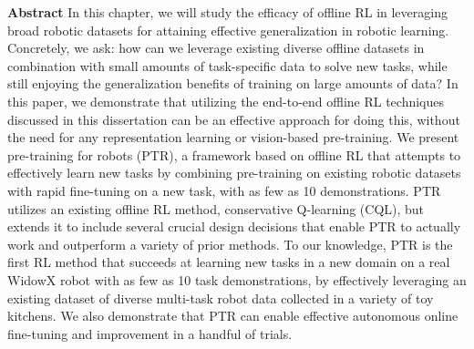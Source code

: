 \documentclass[../thesis.tex]{subfiles}
\begin{document}

\vspace{-0.4cm}
\begin{AIbox}{\large{\textbf{Abstract}}}
\vspace{4mm}
In this chapter, we will study the efficacy of offline RL in leveraging broad robotic datasets for attaining effective generalization in robotic learning.  Concretely, we ask: how can we leverage existing diverse offline datasets in combination with small amounts of task-specific data to solve new tasks, while still enjoying the generalization benefits of training on large amounts of data? In this paper, we demonstrate that utilizing the end-to-end offline RL techniques discussed in this dissertation can be an effective approach for doing this, without the need for any representation learning or vision-based pre-training. We present pre-training for robots (PTR), a framework based on offline RL that attempts to effectively learn new tasks by combining pre-training on existing robotic datasets with rapid fine-tuning on a new task, with as few as 10 demonstrations. PTR utilizes an existing offline RL method, conservative Q-learning (CQL), but extends it to include several crucial design decisions that enable PTR to actually work and outperform a variety of prior methods. To our knowledge, PTR is the first RL method that succeeds at learning new tasks in a new domain on a real WidowX robot with as few as 10 task demonstrations, by effectively leveraging an existing dataset of diverse multi-task robot data collected in a variety of toy kitchens. We also demonstrate that PTR can enable effective autonomous online fine-tuning and improvement in a handful of trials.
\vspace{2mm}
\end{AIbox}






	
\end{document}
